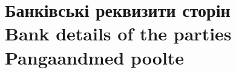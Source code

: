 %
%
%
%
%
\pagebreak
\section{Банківські реквизити сторін\\Bank details of the parties\\Pangaandmed poolte}
\label{app:bank}
